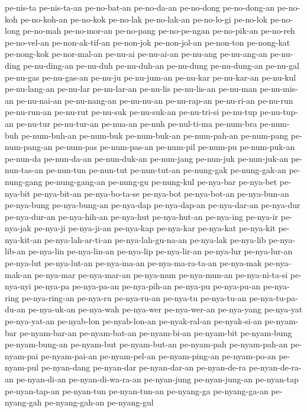 {pe-nis-ta pe-nis-ta-an pe-no-bat-an pe-no-da-an pe-no-dong pe-no-dong-an
pe-no-koh pe-no-koh-an pe-no-kok pe-no-lak pe-no-lak-an pe-no-lo-gi
pe-no-lok pe-no-long pe-no-mah pe-no-mor-an pe-no-pang pe-no-pe-ngan
pe-no-pik-an pe-no-reh pe-no-vel-an pe-non-ak-tif-an pe-non-jok
pe-non-jol-an pe-non-ton pe-nong-kat pe-nong-kok pe-nor-mal-an pe-nu-ai
pe-nu-ai-an pe-nu-ang pe-nu-ang-an pe-nu-ding pe-nu-ding-an pe-nu-duh
pe-nu-duh-an pe-nu-dung pe-nu-dung-an pe-nu-gal pe-nu-gas pe-nu-gas-an
pe-nu-ju pe-nu-jum-an pe-nu-kar pe-nu-kar-an pe-nu-kul pe-nu-lang-an
pe-nu-lar pe-nu-lar-an pe-nu-lis pe-nu-lis-an pe-nu-man pe-nu-mis-an
pe-nu-nai-an pe-nu-nang-an pe-nu-nu-an pe-nu-rap-an pe-nu-ri-an pe-nu-run
pe-nu-run-an pe-nu-rut pe-nu-suk pe-nu-suk-an pe-nu-tri-si pe-nu-tup
pe-nu-tup-an pe-nu-tur pe-nu-tur-an pe-nua-an pe-nuh pe-nul-ti-ma
pe-num-bra pe-num-buh pe-num-buh-an pe-num-buk pe-num-buk-an pe-num-pah-an
pe-num-pang pe-num-pang-an pe-num-pas pe-num-pas-an pe-num-pil pe-num-pu
pe-num-puk-an pe-nun-da pe-nun-da-an pe-nun-duk-an pe-nun-jang pe-nun-juk
pe-nun-juk-an pe-nun-tas-an pe-nun-tun pe-nun-tut pe-nun-tut-an
pe-nung-gak pe-nung-gak-an pe-nung-gang pe-nung-gang-an pe-nung-gu
pe-nung-kul pe-nya-bar pe-nya-bet pe-nya-bit pe-nya-bit-an pe-nya-bo-ta-se
pe-nya-bot pe-nya-bot-an pe-nya-bun-an pe-nya-bung pe-nya-bung-an
pe-nya-dap pe-nya-dap-an pe-nya-dar-an pe-nya-dur pe-nya-dur-an
pe-nya-hih-an pe-nya-hut pe-nya-hut-an pe-nya-ing pe-nya-ir pe-nya-jak
pe-nya-ji pe-nya-ji-an pe-nya-kap pe-nya-kar pe-nya-kat pe-nya-kit
pe-nya-kit-an pe-nya-lah-ar-ti-an pe-nya-lah-gu-na-an pe-nya-lak
pe-nya-lib pe-nya-lib-an pe-nya-lin pe-nya-lin-an pe-nya-lip pe-nya-lir-an
pe-nya-lur pe-nya-lur-an pe-nya-lut pe-nya-lut-an pe-nya-ma-an
pe-nya-ma-ra-ta-an pe-nya-mak pe-nya-mak-an pe-nya-mar pe-nya-mar-an
pe-nya-mun pe-nya-mun-an pe-nya-ni-ta-si pe-nya-nyi pe-nya-pa pe-nya-pa-an
pe-nya-pih-an pe-nya-pu pe-nya-pu-an pe-nya-ring pe-nya-ring-an pe-nya-ru
pe-nya-ru-an pe-nya-tu pe-nya-tu-an pe-nya-tu-pa-du-an pe-nya-uk-an
pe-nya-wah pe-nya-wer pe-nya-wer-an pe-nya-yang pe-nya-yat pe-nya-yat-an
pe-nyab-lon pe-nyab-lon-an pe-nyak-ral-an pe-nyak-si-an pe-nyam-bar
pe-nyam-bar-an pe-nyam-bat-an pe-nyam-bi-an pe-nyam-bit pe-nyam-bung
pe-nyam-bung-an pe-nyam-but pe-nyam-but-an pe-nyam-pah pe-nyam-pah-an
pe-nyam-pai pe-nyam-pai-an pe-nyam-pel-an pe-nyam-ping-an pe-nyam-po-an
pe-nyam-pul pe-nyan-dang pe-nyan-dar pe-nyan-dar-an pe-nyan-de-ra
pe-nyan-de-ra-an pe-nyan-di-an pe-nyan-di-wa-ra-an pe-nyan-jung
pe-nyan-jung-an pe-nyan-tap pe-nyan-tap-an pe-nyan-tun pe-nyan-tun-an
pe-nyang-ga pe-nyang-ga-an pe-nyang-gah pe-nyang-gah-an pe-nyang-gul
}
